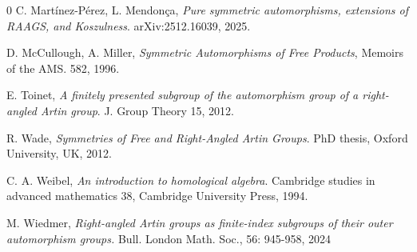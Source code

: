 \documentclass[a4paper]{amsart}
\theoremstyle{definition}
\theoremstyle{remark}
\begin{document}
\begin{thebibliography}{0}
 C. Martínez-Pérez, L. Mendonça, \textit{Pure symmetric automorphisms, extensions of RAAGS, and Koszulness}. 	arXiv:2512.16039, 2025.

 D. McCullough, A. Miller, \textit{Symmetric Automorphisms of Free Products}, Memoirs of the AMS. 582, 1996.


 E. Toinet, \textit{A finitely presented subgroup of the automorphism group of a right-angled
Artin group}. J. Group Theory 15, 2012.

 R. Wade, \textit{Symmetries of Free and Right-Angled Artin Groups}.   PhD thesis, Oxford University, UK, 2012.

 C. A. Weibel, \textit{An introduction to homological algebra}. Cambridge studies in advanced mathematics 38, Cambridge University Press, 1994.

 M. Wiedmer, \textit{Right-angled Artin groups as finite-index subgroups of their outer automorphism groups.}  Bull. London Math. Soc., 56: 945-958, 2024

\end{thebibliography}
\end{document}
